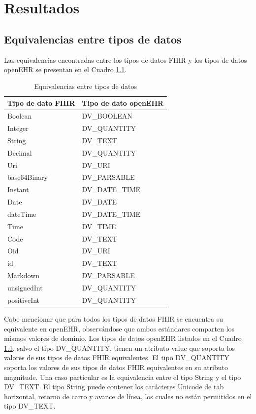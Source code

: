 \chapter{Resultados}

\section{Equivalencias entre tipos de datos}

Las equivalencias encontradas entre los tipos de datos FHIR y los tipos de datos openEHR se presentan en el Cuadro \ref{table:equivalents}.

\begin{table}[h]
  \caption{Equivalencias entre tipos de datos}
  \label{table:equivalents}
  \begin{tabular}{l l}
    \hline
    Tipo de dato FHIR &	Tipo de dato openEHR \\
    \hline
    Boolean	& DV\_BOOLEAN \\
    Integer	& DV\_QUANTITY \\
    String	& DV\_TEXT \\
    Decimal	& DV\_QUANTITY \\
    Uri	& DV\_URI \\
    base64Binary	& DV\_PARSABLE \\
    Instant	& DV\_DATE\_TIME \\
    Date	& DV\_DATE \\
    dateTime	& DV\_DATE\_TIME \\
    Time	& DV\_TIME \\
    Code	& DV\_TEXT \\
    Oid	& DV\_URI \\
    id 	& DV\_TEXT \\
    Markdown	& DV\_PARSABLE \\
    unsignedInt	& DV\_QUANTITY \\
    positiveInt	& DV\_QUANTITY \\
    \hline
  \end{tabular}
\end{table}

Cabe mencionar que para todos los tipos de datos FHIR se encuentra su equivalente en openEHR, observándose que ambos estándares comparten los mismos valores de dominio. Los tipos de datos openEHR listados en el Cuadro \ref{table:equivalents}, salvo el tipo DV\_QUANTITY, tienen un atributo value que soporta los valores de sus tipos de datos FHIR equivalentes. El tipo DV\_QUANTITY soporta los valores de sus tipos de datos FHIR equivalentes en su atributo magnitude. Una caso particular es la equivalencia entre el tipo String y el tipo DV\_TEXT. El tipo String puede contener los carácteres Unicode  de tab horizontal, retorno de carro y avance de línea, los cuales no están permitidos en el tipo DV\_TEXT.

